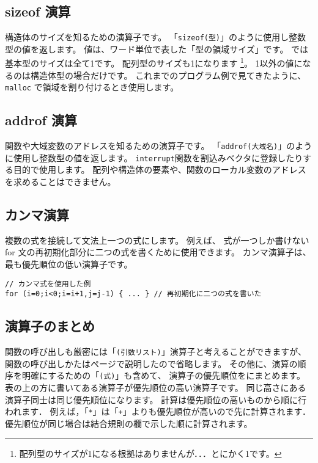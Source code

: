 \subsection{sizeof 演算}

構造体のサイズを知るための演算子です。
「\verb/sizeof(型)/」のように使用し整数型の値を返します。
値は、ワード単位で表した「型の領域サイズ」です。
\cmml では基本型のサイズは全て1です。
配列型のサイズも1になります
\footnote{配列型のサイズが1になる根拠はありませんが．．．とにかく1です。}。
1以外の値になるのは構造体型の場合だけです。
これまでのプログラム例で見てきたように、
\verb/malloc/ で領域を割り付けるとき使用します。

\subsection{addrof 演算}
\label{chap3:addrof}

関数や大域変数のアドレスを知るための演算子です。
「\verb/addrof(大域名)/」のように使用し整数型の値を返します。
\verb/interrupt/関数を割込みベクタに登録したりする目的で使用します。
配列や構造体の要素や、関数のローカル変数のアドレスを求めることはできません。

\subsection{カンマ演算}

複数の式を接続して文法上一つの式にします。
例えば、
式が一つしか書けない for 文の再初期化部分に二つの式を書くために使用できます。
カンマ演算子は、最も優先順位の低い演算子です。

\begin{mylist}
\begin{verbatim}
// カンマ式を使用した例
for (i=0;i<0;i=i+1,j=j-1) { ... } // 再初期化に二つの式を書いた
\end{verbatim}
\end{mylist}

\subsection{演算子のまとめ}

関数の呼び出しも厳密には「\verb/(引数リスト)/」演算子と考えることができますが、
関数の呼び出しかたは\pageref{chap3:func}ページで説明したので省略します。
その他に、演算の順序を明確にするための「\verb/(式)/」も含めて、
演算子の優先順位をにまとめます。
表の上の方に書いてある演算子が優先順位の高い演算子です。
同じ高さにある演算子同士は同じ優先順位になります。
計算は優先順位の高いものから順に行われます．
例えば，「\verb/*/」は「\verb/+/」よりも優先順位が高いので先に計算されます．
優先順位が同じ場合は結合規則の欄で示した順に計算されます。

